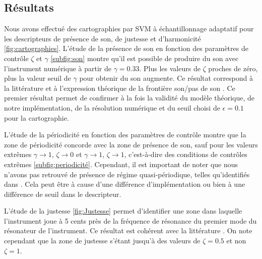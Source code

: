 \documentclass[french, twocolumn]{article}
\begin{document}
\subsection{Résultats}
Nous avons effectué des cartographies par SVM à échantillonnage adaptatif pour les descripteurs de présence de son, de justesse et d'harmonicité \ref{fig:cartographies}. 
L'étude de la présence de son en fonction des paramètres de contrôle $\zeta$ et $\gamma$ \ref{subfig:son} montre qu'il est possible de produire du son avec l'instrument numérique à partir de $\gamma=0.33$. Plus les valeurs de $\zeta$ proches de zéro, plus la valeur seuil de $\gamma$ pour obtenir du son augmente. Ce résultat correspond à la littérature et à l'expression théorique de la frontière son/pas de son \cite{missoum_explicit_2014}. Ce premier résultat permet de confirmer à la fois la validité du modèle théorique, de notre implémentation, de la résolution numérique et du seuil choisi de $\epsilon = 0.1$ pour la cartographie. 

L'étude de la périodicité en fonction des paramètres de contrôle montre que la zone de périodicité concorde avec la zone de présence de son, sauf pour les valeurs extrêmes $\gamma \to 1$, $\zeta \to 0$ et $\gamma \to 1$, $\zeta \to 1$, c'est-à-dire des conditions de contrôles extrêmes \ref{subfig:periodicité}. Cependant, il est important de noter que nous n'avons pas retrouvé de présence de régime quasi-périodique, telles qu'identifiés dans \cite{doc2014minimal}. Cela peut être à cause d'une différence d'implémentation ou bien à une différence de seuil dans le descripteur. 

L'étude de la justesse \ref{fig:Justesse} permet d'identifier une zone dans laquelle l'instrument joue à 5 cents près de la fréquence de résonance du premier mode du résonateur de l'instrument. Ce résultat est cohérent avec la littérature \cite{missoum_explicit_2014}. On note cependant que la zone de justesse s'étant jusqu'à des valeurs de $\zeta = 0.5$ et non $\zeta = 1$. 
\end{document}
